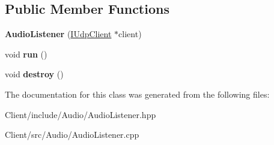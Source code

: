 \subsection*{Public Member Functions}
\begin{DoxyCompactItemize}
\item 
\mbox{\label{classbbl_1_1cli_1_1audio_1_1_audio_listener_ac9340086f6765ccc17fa23209a15f388}} 
{\bfseries Audio\+Listener} (\hyperlink{classbbl_1_1cli_1_1_i_udp_client}{I\+Udp\+Client} $\ast$client)
\item 
\mbox{\label{classbbl_1_1cli_1_1audio_1_1_audio_listener_a2a01bf427f620ab8d2417c2502ebf7fb}} 
void {\bfseries run} ()
\item 
\mbox{\label{classbbl_1_1cli_1_1audio_1_1_audio_listener_a366e2bd9318fd03a8e559d809c1656c5}} 
void {\bfseries destroy} ()
\end{DoxyCompactItemize}


The documentation for this class was generated from the following files\+:\begin{DoxyCompactItemize}
\item 
Client/include/\+Audio/Audio\+Listener.\+hpp\item 
Client/src/\+Audio/Audio\+Listener.\+cpp\end{DoxyCompactItemize}
